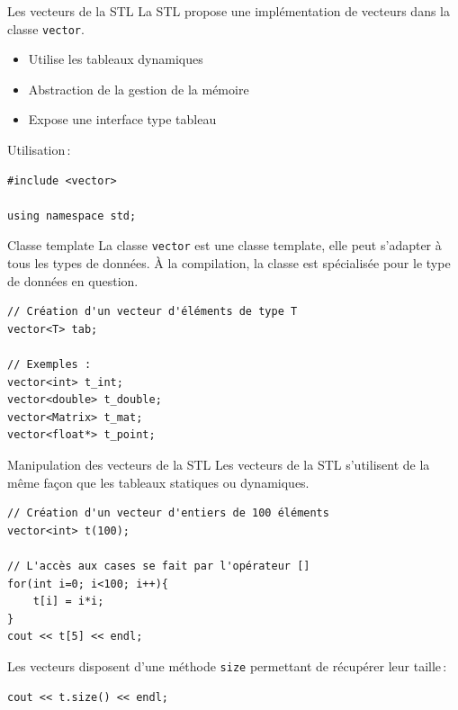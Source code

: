 \begin{frame}[fragile]{Les vecteurs de la STL}
    La STL propose une implémentation de vecteurs dans la classe \texttt{vector}.
    \begin{itemize}
        \item Utilise les tableaux dynamiques
        \item Abstraction de la gestion de la mémoire
        \item Expose une interface type tableau
    \end{itemize}
    
Utilisation\,:
        \begin{verbatim}
#include <vector>

using namespace std;
        \end{verbatim}
    
\end{frame}

\begin{frame}[fragile]{Classe template}
    La classe \texttt{vector} est une classe template, elle peut s'adapter à tous les types de données. À la compilation, la classe est spécialisée pour le type de données en question.
    
        \begin{verbatim}
// Création d'un vecteur d'éléments de type T
vector<T> tab;

// Exemples :
vector<int> t_int;
vector<double> t_double;
vector<Matrix> t_mat;
vector<float*> t_point;
        \end{verbatim}
\end{frame}

\begin{frame}[fragile]{Manipulation des vecteurs de la STL}
    Les vecteurs de la STL s'utilisent de la même façon que les tableaux statiques ou dynamiques.
    
        \begin{verbatim}
// Création d'un vecteur d'entiers de 100 éléments
vector<int> t(100);

// L'accès aux cases se fait par l'opérateur []
for(int i=0; i<100; i++){
    t[i] = i*i;
}
cout << t[5] << endl;
		\end{verbatim}
        
Les vecteurs disposent d'une méthode \texttt{size} permettant de récupérer leur taille\,:
		\begin{verbatim}
cout << t.size() << endl;
        \end{verbatim}
\end{frame}

